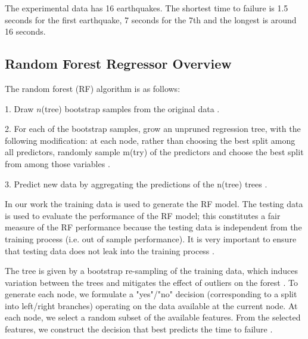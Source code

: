 \documentclass[]{llncs} %
\begin{document}
The experimental data has 16 earthquakes. The shortest time to failure is 1.5 seconds for the first earthquake, 7 seconds for the 7th and the longest is around 16 seconds. \par

\subsection{Random Forest Regressor Overview}
The random forest (RF) algorithm is as follows:\par
1. Draw $n$(tree) bootstrap samples from the original data \cite{Liaw}.\par
2. For each of the bootstrap samples, grow an unpruned regression tree, with the following modification: at each node, rather than choosing the best split among all predictors, randomly sample m(try) of the predictors and choose the best split from among those variables \cite{Liaw}.\par
3. Predict new data by aggregating the predictions of the n(tree) trees \cite{Liaw}.\par
In our work the training data is used to generate the RF model. The testing data is used to evaluate the performance of the RF model; this constitutes a fair measure of the RF performance because the testing data is independent from the training process (i.e. out of sample performance). It is very important to ensure that testing data does not leak into the training process \cite{Bertrand}. \par
The tree is given by a bootstrap re-sampling of the training data, which induces variation between the trees and mitigates the effect of outliers on the forest \cite{Bertrand}. To generate each node, we formulate a "yes"/"no" decision (corresponding to a split into left/right branches) operating on the data available at the current node. At each node, we select a random subset of the available features. From the selected features, we construct the decision that best predicts the time to failure \cite{Bertrand}.
\end{document}
